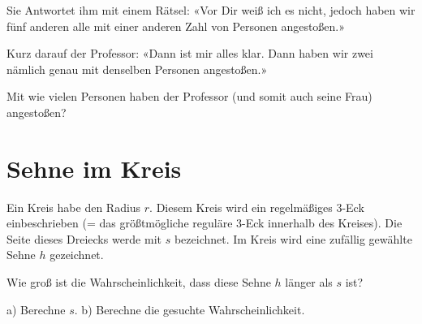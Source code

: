 Sie Antwortet ihm mit einem Rätsel: «Vor Dir weiß ich es nicht, jedoch haben
wir fünf anderen alle mit einer anderen Zahl von Personen angestoßen.»

Kurz darauf der Professor: «Dann ist mir alles klar. Dann haben wir zwei
nämlich genau mit denselben Personen angestoßen.»

Mit wie vielen Personen haben der Professor (und somit auch seine Frau)
angestoßen?

\TNTeop{}






\section{Sehne im Kreis}



Ein Kreis habe den Radius $r$. Diesem Kreis wird ein regelmäßiges 3-Eck
einbeschrieben (= das größtmögliche reguläre 3-Eck innerhalb des Kreises). Die Seite dieses Dreiecks
werde mit $s$ bezeichnet. Im Kreis wird eine zufällig gewählte Sehne $h$
gezeichnet.

Wie groß ist die Wahrscheinlichkeit, dass diese Sehne $h$ länger als $s$ ist?

a) Berechne $s$.
b) Berechne die gesuchte Wahrscheinlichkeit.


\TNTeop{}

